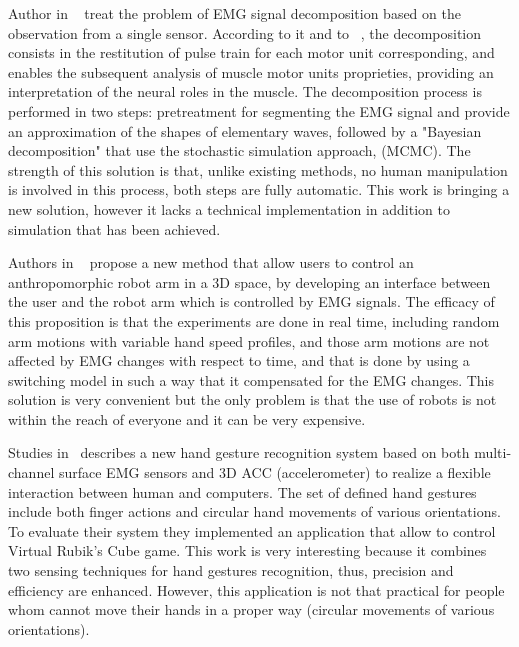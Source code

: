 \documentclass[conference]{IEEEtran}
\begin{document}
Author in ~\cite{LeCarpentier} treat the problem of EMG signal decomposition based on the observation from a single sensor. According to it and to ~\cite{DeLuca}, the decomposition consists in the restitution of pulse train for each motor unit corresponding, and enables the subsequent analysis of muscle motor units proprieties, providing an interpretation of the neural roles in the muscle. The decomposition process is performed in two steps: pretreatment for segmenting the EMG signal and provide an approximation of the shapes of elementary waves, followed by a "Bayesian decomposition" that use the stochastic simulation approach, (MCMC).
The strength of this solution is that, unlike existing methods, no human manipulation is involved in this process, both steps are fully automatic. This work is bringing a new solution, however it lacks a technical implementation in addition to simulation that has been achieved.\par%
Authors in ~\cite{Artemiadis} propose a new method that allow users to control an anthropomorphic robot arm in a 3D space, by developing an interface between the user and the robot arm which is controlled by EMG signals. The efficacy of this proposition is that the experiments are done in real time, including random arm motions with variable hand speed profiles, and those arm motions are not affected by EMG changes with respect to time, and that is done by using a switching model in such a way that it compensated for the EMG changes. This solution is very convenient but the only problem is that the use of robots is not within the reach of everyone and it can be very expensive.\par
Studies in~\cite{Zhang} describes a new hand gesture recognition system based on both multi-channel surface EMG sensors and 3D ACC (accelerometer) to realize a flexible interaction between human and computers. The set of defined hand gestures include both finger actions and circular hand movements of various orientations. To evaluate their system they implemented an application that allow to control Virtual Rubik's Cube game. This work is very interesting because it combines two sensing techniques for hand gestures recognition, thus, precision and efficiency are enhanced. However, this application is not that practical for people whom cannot move their hands in a proper way (circular movements of various orientations).\par
\end{document}
